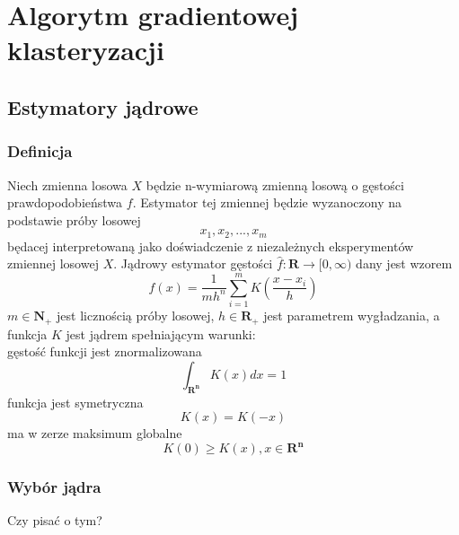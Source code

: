 \chapter{Algorytm gradientowej klasteryzacji}
\label{cha:gradient_clustering_algorithm}

\section{Estymatory jądrowe}
\label{sec:estymatory}
\subsection{Definicja}

Niech zmienna losowa $X$ będzie n-wymiarową zmienną losową o gęstości prawdopodobieństwa $f$. Estymator tej zmiennej będzie wyzanoczony na podstawie próby losowej
\begin{equation}
x_1, x_2, ..., x_m
\end{equation}
będacej interpretowaną jako doświadczenie z niezależnych eksperymentów zmiennej losowej $X$.
Jądrowy estymator gęstości $\hat{f}: \mathbf{R} \to [0, \infty)$ dany jest wzorem
\begin{equation}
\label{eq:estymator}
\hat{f}(x)=\frac{1}{mh^n} \displaystyle \sum_{i=1}^{m}K(\frac{x-x_i}{h})
\end{equation}
$m \in \mathbf{N_+}$ jest licznością próby losowej, $h \in \mathbf{R_+}$ jest parametrem wygładzania, a funkcja $K$ jest jądrem spełniającym warunki: \\
gęstość funkcji jest znormalizowana
\begin{equation}
\int_{\mathbf{R^n}} K(x)dx = 1
\end{equation}
funkcja jest symetryczna
\begin{equation}
K(x) = K(-x)
\end{equation}
ma w zerze maksimum globalne
\begin{equation}
K(0) \geq K(x), x \in \mathbf{R^n}
\end{equation}

\subsection{Wybór jądra}
Czy pisać o tym?

